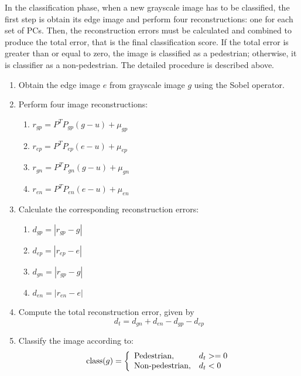 \documentclass[10pt, conference, compsocconf]{IEEEtran}
\begin{document}
In the classification phase, when a new grayscale image has to be classified, the first step is obtain its edge image and perform four reconstructions: one for each set of PCs. Then, the reconstruction errors must be calculated and combined to produce the total error, that is the final classification score. If the total error is greater than or equal to zero, the image is classified as a pedestrian; otherwise, it is classifier as a non-pedestrian. The detailed procedure is described above.

\begin{enumerate}
  \item Obtain the edge image $e$ from grayscale image $g$ using the Sobel operator.
  \item Perform four image reconstructions:
    \begin{enumerate}
      \item $r_{gp} = P^T P_{gp}(g-u) + \mu_{gp}$
      \item $r_{ep} = P^T P_{ep}(e-u) + \mu_{ep}$
      \item $r_{gn} = P^T P_{gn}(g-u) + \mu_{gn}$
      \item $r_{en} = P^T P_{en}(e-u) + \mu_{en}$
    \end{enumerate}
  \item Calculate the corresponding reconstruction errors:
    \begin{enumerate}
      \item $d_{gp} = |r_{gp} - g|$
      \item $d_{ep} = |r_{ep} - e|$
      \item $d_{gn} = |r_{gp} - g|$
      \item $d_{en} = |r_{en} - e|$
    \end{enumerate}
  \item Compute the total reconstruction error, given by
    \begin{equation}
      d_t = d_{gn} + d_{en} - d_{gp} - d_{ep}
      \label{total_error}
    \end{equation}
  \item Classify the image according to:
    \begin{equation}
      \textrm{class}(g) = \left\{
        \begin{array}{l l}
         \textrm{Pedestrian}, & d_t >= 0\\
         \textrm{Non-pedestrian}, & d_t < 0
        \end{array}
      \right.
    \end{equation}
  
\end{enumerate}
\end{document}
